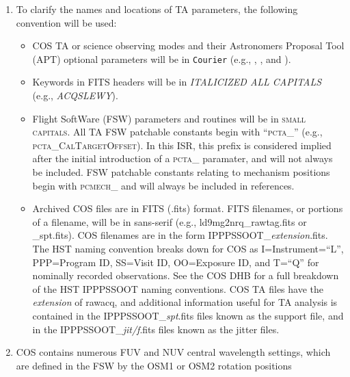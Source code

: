 \begin{enumerate}
{		as these are how they are implemented in the HST ground commanding.}
	\item{To clarify the names and locations of TA parameters, the following convention will be used:
		\begin{itemize}
			\item{COS TA or science observing modes and their Astronomers Proposal Tool (APT) optional parameters will be in \texttt{Courier} (e.g., , \extsci, and \numpos).}
			\item{Keywords in FITS headers will be in \textit{ITALICIZED ALL CAPITALS} (e.g., \textit{ACQSLEWY}).}
			\item{Flight SoftWare (FSW) parameters and routines will be in \textsc{small capitals}.
			All TA FSW patchable constants begin with ``\textsc{pcta\_}'' (e.g., \textsc{pcta\_CalTargetOffset}).
			In this ISR, this prefix is considered implied after the initial introduction of a \textsc{pcta\_} paramater, and will not always be included.
			FSW patchable constants relating to mechanism positions begin with \textsc{pcmech\_} and will always be included in references.}
			\item{Archived COS files are in FITS (.fits) format. FITS filenames, or portions of a filename, will be in {\sf sans-serif} (e.g., {\sf ld9mg2nrq\_rawtag.fits} or {\sf \_spt.fits}).
			COS filenames are in the form {\sf IPPPSSOOT\_{\it extension}.fits}.
			The HST naming convention breaks down for COS as I=Instrument=``L'', PPP=Program ID, SS=Visit ID, OO=Exposure ID,
			and T=``Q'' for nominally recorded observations. See the COS DHB for a full breakdown of the HST IPPPSSOOT naming conventions.
			COS TA files have the {\it extension} of {\sf rawacq}, and additional
			information useful for TA analysis is contained in the {\sf IPPPSSOOT\_{\it spt}.fits} files known as the support file,
			and in the {\sf IPPPSSOOT\_{\it jit/f}.fits} files known as the jitter files.}
		\end{itemize}
	}
	\item{COS contains numerous FUV and NUV central wavelength settings, which are defined in the FSW by the OSM1 or OSM2 rotation positions
}
\end{enumerate}
